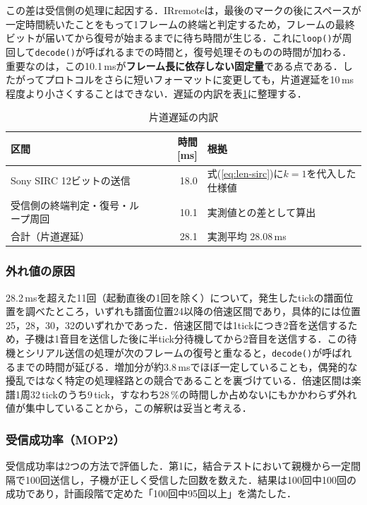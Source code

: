 \documentclass[uplatex,dvipdfmx]{jlreq}
\begin{document}
この差は受信側の処理に起因する．IRremoteは，最後のマークの後にスペースが一定時間続いたことをもって1フレームの終端と判定するため，フレームの最終ビットが届いてから復号が始まるまでに待ち時間が生じる\cite{irremote}．これに\texttt{loop()}が周回して\texttt{decode()}が呼ばれるまでの時間と，復号処理そのものの時間が加わる．重要なのは，この10.1\,msが\textbf{フレーム長に依存しない固定量}である点である．したがってプロトコルをさらに短いフォーマットに変更しても，片道遅延を10\,ms程度より小さくすることはできない．遅延の内訳を表\ref{tab:latency-breakdown}に整理する．

\begin{table}[tb]
\caption{片道遅延の内訳}
\label{tab:latency-breakdown}
\begin{center}
\small
\begin{tabular}{lrl}
\hline
区間 & 時間 [ms] & 根拠 \\
\hline
Sony SIRC 12ビットの送信 & 18.0 & 式(\ref{eq:len-sirc})に$k=1$を代入した仕様値 \\
受信側の終端判定・復号・ループ周回 & 10.1 & 実測値との差として算出 \\
\hline
合計（片道遅延） & 28.1 & 実測平均 28.08\,ms \\
\hline
\end{tabular}
\end{center}
\end{table}

\subsubsection{外れ値の原因}

28.2\,msを超えた11回（起動直後の1回を除く）について，発生したtickの譜面位置を調べたところ，いずれも譜面位置24以降の倍速区間であり，具体的には位置25，28，30，32のいずれかであった．倍速区間では1tickにつき2音を送信するため，子機は1音目を送信した後に半tick分待機してから2音目を送信する．この待機とシリアル送信の処理が次のフレームの復号と重なると，\texttt{decode()}が呼ばれるまでの時間が延びる．増加分が約3.8\,msでほぼ一定していることも，偶発的な擾乱ではなく特定の処理経路との競合であることを裏づけている．倍速区間は楽譜1周32\,tickのうち9\,tick，すなわち28\,\%の時間しか占めないにもかかわらず外れ値が集中していることから，この解釈は妥当と考える．

\subsubsection{受信成功率（MOP2）}

受信成功率は2つの方法で評価した．第1に，結合テストにおいて親機から一定間隔で100回送信し，子機が正しく受信した回数を数えた．結果は100回中100回の成功であり，計画段階で定めた「100回中95回以上」を満たした．
\end{document}

